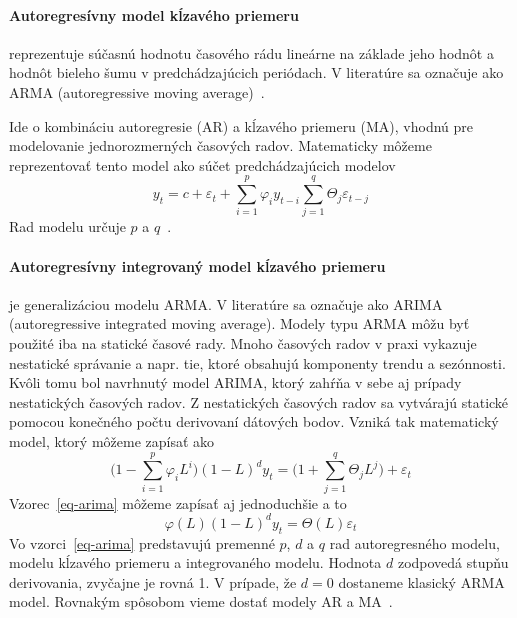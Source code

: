 \documentclass[a4paper,slovak,12pt,appendix]{article}
\begin{document}
\paragraph{Autoregresívny model kĺzavého priemeru} reprezentuje súčasnú hodnotu
časového rádu lineárne na základe jeho hodnôt a hodnôt bieleho šumu
v predchádzajúcich periódach. V literatúre sa označuje ako ARMA (autoregressive
moving average)~\cite{KumarSingh2013}.

Ide o kombináciu autoregresie (AR) a kĺzavého priemeru (MA), vhodnú pre
modelovanie jednorozmerných časových radov. Matematicky môžeme reprezentovať
tento model ako súčet predchádzajúcich modelov
\begin{equation}
  y_t = c + \varepsilon_t + \sum_{i=1}^{p} \varphi_i y_{t-i}  \sum_{j=1}^{q} \Theta_j \varepsilon_{t-j}
  \label{eq-arma}
\end{equation}
Rad modelu určuje $p$ a $q$~\cite{Agrawal2013}.

\paragraph{Autoregresívny integrovaný model kĺzavého priemeru} je
generalizáciou modelu ARMA. V literatúre sa označuje ako ARIMA (autoregressive
integrated moving average). Modely typu ARMA môžu byť použité iba na statické
časové rady. Mnoho časových radov v praxi vykazuje nestatické správanie a napr.
tie, ktoré obsahujú komponenty trendu a sezónnosti. Kvôli tomu bol navrhnutý
model ARIMA, ktorý zahŕňa v sebe aj prípady nestatických časových radov.
Z nestatických časových radov sa vytvárajú statické pomocou konečného počtu
derivovaní dátových bodov. Vzniká tak matematický model, ktorý môžeme zapísať
ako
\begin{equation}
  \Big( 1 - \sum_{i=1}^{p} \varphi_i L^i \Big) (1-L)^d y_t = \Big( 1 + \sum_{j=1}^{q} \Theta_j L^j \Big) + \varepsilon_t
  \label{eq-arima}
\end{equation}
Vzorec~\ref{eq-arima} môžeme zapísať aj jednoduchšie a to
\begin{equation}
  \varphi(L) (1-L)^d y_t = \Theta(L) \varepsilon_t
  \label{eq-arima-short}
\end{equation}
Vo vzorci~\ref{eq-arima} predstavujú premenné $p$, $d$ a $q$ rad autoregresného
modelu, modelu kĺzavého priemeru a integrovaného modelu. Hodnota $d$ zodpovedá
stupňu derivovania, zvyčajne je rovná 1. V prípade, že $d=0$ dostaneme klasický
ARMA model. Rovnakým spôsobom vieme dostať modely AR a MA~\cite{Agrawal2013}.
\end{document}
